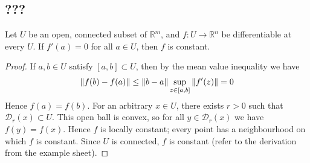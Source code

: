 \subsection{???}
\begin{corollary}
	Let \( U \) be an open, connected subset of \( \mathbb R^m \), and \( f \colon U \to \mathbb R^n \) be differentiable at every \( U \).
	If \( f'(a) = 0 \) for all \( a \in U \), then \( f \) is constant.
\end{corollary}
\begin{proof}
	If \( a, b \in U \) satisfy \( [a,b] \subset U \), then by the mean value inequality we have
	\[
		\norm{f(b) - f(a)} \leq \norm{b-a} \sup_{z \in [a,b]} \norm{f'(z)} = 0
	\]
	Hence \( f(a) = f(b) \).
	For an arbitrary \( x \in U \), there exists \( r > 0 \) such that \( \mathcal D_r(x) \subset U \).
	This open ball is convex, so for all \( y \in \mathcal D_r(x) \) we have \( f(y) = f(x) \).
	Hence \( f \) is locally constant; every point has a neighbourhood on which \( f \) is constant.
	Since \( U \) is connected, \( f \) is constant (refer to the derivation from the example sheet).
\end{proof}

